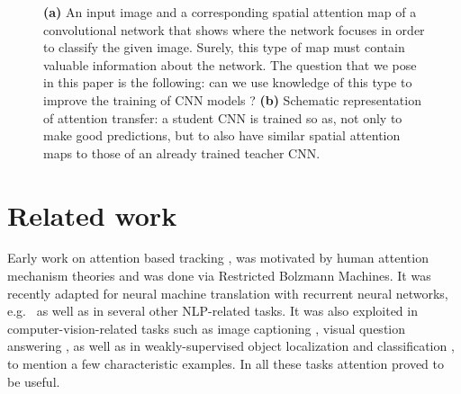 \documentclass{article} \usepackage{iclr2017_conference}
\begin{document}
\begin{figure}
  \vspace{-1.2cm}
  \centering
  \hspace{0.5cm}
  \vspace{-0.3cm}
  \caption{\textbf{(a)} An input image and a corresponding spatial attention map of a convolutional network that shows where the network focuses in order to classify the given image. Surely, this type of map must  contain valuable information about the network.  The question that we pose in this paper is the following: can we use knowledge of this type to improve the training of CNN models ? \textbf{(b)} Schematic representation of attention transfer:   a student CNN is trained so as, not only to make good predictions, but  to also have similar spatial attention maps to those of an already trained teacher CNN. }
  \label{fig:wolf}
\end{figure}



\section{Related work}\label{sec:related_work}

Early work on attention based tracking \cite{NIPS2010_4089}, \cite{Denil2012a} was motivated by human attention mechanism theories \cite{rensink} and was done via Restricted Bolzmann Machines. It was recently adapted for neural machine translation with recurrent neural networks, e.g.\ \cite{DBLP:journals/corr/BahdanauCB14} as well as in several other NLP-related tasks. It was also exploited in computer-vision-related tasks such as image captioning \cite{showattendtell}, visual question answering   \cite{YangHGDS15}, as well as  in weakly-supervised object localization \cite{Oquab15} and classification \cite{NIPS2014_5542}, to mention a few characteristic examples. In all these tasks attention proved to be useful.
\end{document}
